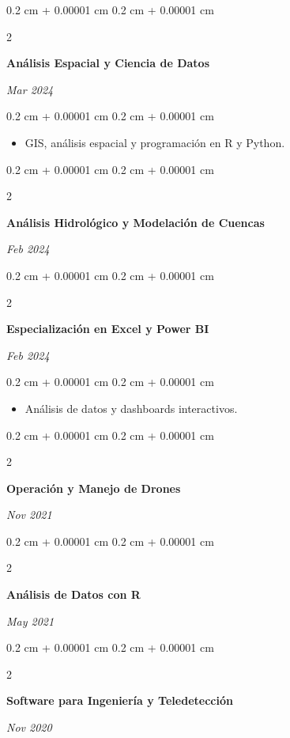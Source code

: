 \documentclass[10pt, letterpaper]{article}
\newenvironment{highlights}{
    \begin{itemize}[
        topsep=0.10 cm,
        parsep=0.10 cm,
        partopsep=0pt,
        itemsep=0pt,
        leftmargin=0.4 cm + 10pt
    ]
}{
    \end{itemize}
} %
\newenvironment{onecolentry}{
    \begin{adjustwidth}{
        0.2 cm + 0.00001 cm
    }{
        0.2 cm + 0.00001 cm
    }
}{
    \end{adjustwidth}
} %
\newenvironment{twocolentry}[2][]{
    \onecolentry
    \def\secondColumn{#2}
    \setcolumnwidth{\fill, 4.5 cm}
    \begin{paracol}{2}
}{
    \switchcolumn \raggedleft \secondColumn
    \end{paracol}
    \endonecolentry
} %
\begin{document}
\vspace{0.2 cm}

\begin{twocolentry}{
    \textit{Mar 2024}
}
\textbf{Análisis Espacial y Ciencia de Datos}
\end{twocolentry}

\vspace{0.10 cm}
\begin{onecolentry}
  \begin{highlights}
    \item GIS, análisis espacial y programación en R y Python.
  \end{highlights}
\end{onecolentry}

\vspace{0.2 cm}

\begin{twocolentry}{
    \textit{Feb 2024}
}
\textbf{Análisis Hidrológico y Modelación de Cuencas}
\end{twocolentry}

\vspace{0.2 cm}

\begin{twocolentry}{
    \textit{Feb 2024}
}
\textbf{Especialización en Excel y Power BI}
\end{twocolentry}

\vspace{0.10 cm}
\begin{onecolentry}
  \begin{highlights}
    \item Análisis de datos y dashboards interactivos.
  \end{highlights}
\end{onecolentry}

\vspace{0.2 cm}

\begin{twocolentry}{
    \textit{Nov 2021}
}
\textbf{Operación y Manejo de Drones}
\end{twocolentry}

\vspace{0.2 cm}

\begin{twocolentry}{
    \textit{May 2021}
}
\textbf{Análisis de Datos con R}
\end{twocolentry}

\vspace{0.2 cm}

\begin{twocolentry}{
    \textit{Nov 2020}
}
\textbf{Software para Ingeniería y Teledetección}
\end{twocolentry}
\end{document}
